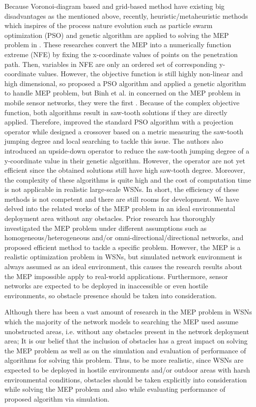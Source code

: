 \documentclass[final]{elsarticle}
\begin{document}
Because Voronoi-diagram based and grid-based method have existing big disadvantages as the mentioned above, recently, heuristic/metaheuristic methods which inspires of the process nature evolution such as particle swarm optimization (PSO) and genetic algorithm are applied to solving the MEP problem in \cite{b11,b12,b25,binh2019efficient}. These researches convert the MEP into a numerically function extreme (NFE) \cite{b8} by fixing the x-coordinate values of points on the penetration path. Then, variables in NFE are only an ordered set of corresponding y-coordinate values. However, the objective function is still highly non-linear and high dimensional, so \cite{b11} proposed a PSO algorithm and \cite {b12,b25,binh2019efficient} applied a genetic algorithm to handle MEP problem, but Binh et al. in \cite{b25} concerned on the MEP problem in mobile sensor networks, they were the first . Because of the complex objective function, both algorithms result in saw-tooth solutions if they are directly applied. Therefore, \cite{b11} improved the standard PSO algorithm with a projection operator while \cite{binh2019efficient} designed a crossover based on a metric measuring the saw-tooth jumping degree and local searching to tackle this issue. The authors \cite{b12} also introduced an upside-down operator to reduce the saw-tooth jumping degree of a y-coordinate value in their genetic algorithm. However, the operator are not yet efficient since the obtained solutions still have high saw-tooth degree. Moreover, the complexity of these algorithms is quite high and the cost of computation time is not applicable in realistic large-scale WSNs. In short, the efficiency of these methods is not competent and there are still rooms for development.
We have delved into the related works of the MEP problem in an ideal environmental deployment area without any obstacles. Prior research has thoroughly investigated the MEP problem under different assumptions such as homogeneous/heterogeneous and/or omni-directional/directional networks, and proposed efficient method to tackle a specific problem. However, the MEP is a realistic optimization problem in WSNs, but simulated network environment is always assumed as an ideal environment, this causes the research results about the MEP impossible apply to real-world applications. Furthermore, sensor networks are expected to be deployed in inaccessible or even hostile environments, so obstacle presence should be taken into consideration.

Although there has been a vast amount of research in
the MEP problem in WSNs which the majority of the
network models to searching the MEP used assume unobstructed areas, i.e. without any obstacles present in the network deployment area;
It is our belief that the inclusion of obstacles has a great impact on solving the MEP problem as well as on the simulation and evaluation of performance of algorithms for solving this problem. Thus, to be more realistic, since WSNs are expected to be deployed in hostile environments and/or outdoor areas with harsh environmental conditions, obstacles should be taken explicitly into consideration while solving the MEP problem and
also while evaluating performance of proposed algorithm via simulation. 
\end{document}
